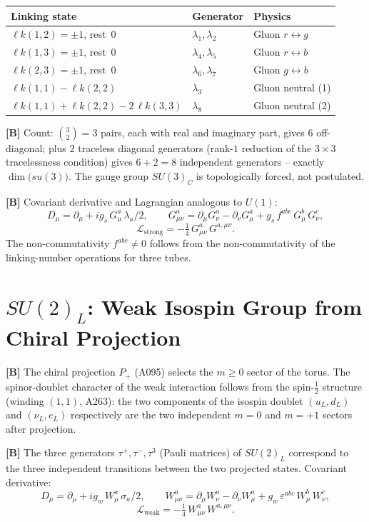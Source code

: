 \begin{center}
\renewcommand{\arraystretch}{1.3}
{\small\begin{tabular}{lll}
\toprule
Linking state & Generator & Physics \\
\midrule
$\ell k(1,2)=\pm1$, rest~0 & $\lambda_1,\lambda_2$ & Gluon $r\leftrightarrow g$ \\
$\ell k(1,3)=\pm1$, rest~0 & $\lambda_4,\lambda_5$ & Gluon $r\leftrightarrow b$ \\
$\ell k(2,3)=\pm1$, rest~0 & $\lambda_6,\lambda_7$ & Gluon $g\leftrightarrow b$ \\
$\ell k(1,1)-\ell k(2,2)$  & $\lambda_3$           & Gluon neutral (1) \\
$\ell k(1,1)+\ell k(2,2)-2\,\ell k(3,3)$ & $\lambda_8$ & Gluon neutral (2) \\
\bottomrule
\end{tabular}}
\renewcommand{\arraystretch}{1.0}
\end{center}

\textbf{[B]} Count: $\binom{3}{2}=3$ pairs, each with real and imaginary part,
gives $6$ off-diagonal; plus $2$ traceless diagonal generators (rank-$1$ reduction
of the $3\times3$ tracelessness condition) gives $6+2=8$ independent generators
-- exactly $\dim\bigl(su(3)\bigr)$. The gauge group $SU(3)_C$ is topologically
forced, not postulated.

\textbf{[B]} Covariant derivative and Lagrangian analogous to $U(1)$:
\[
  D_\mu = \partial_\mu + ig_s\,G_\mu^a\,\lambda_a/2,
  \qquad
  G_{\mu\nu}^a = \partial_\mu G_\nu^a - \partial_\nu G_\mu^a
    + g_s\,f^{abc}\,G_\mu^b\,G_\nu^c,
\]
\[
  \mathcal{L}_\text{strong} = -\tfrac14\,G_{\mu\nu}^a\,G^{a,\mu\nu}.
\]
The non-commutativity $f^{abc}\neq0$ follows from the non-commutativity of the
linking-number operations for three tubes.

\section{$SU(2)_L$: Weak Isospin Group from Chiral Projection}

\textbf{[B]} The chiral projection $P_+$ (A095) selects the $m\ge0$ sector
of the torus. The spinor-doublet character of the weak interaction follows
from the spin-$\tfrac12$ structure (winding $(1,1)$, A263): the two
components of the isospin doublet $(u_L, d_L)$ and $(\nu_L, e_L)$ respectively
are the two independent $m=0$ and $m=+1$ sectors after projection.

\textbf{[B]} The three generators $\tau^+, \tau^-, \tau^3$ (Pauli matrices)
of $SU(2)_L$ correspond to the three independent transitions between the
two projected states. Covariant derivative:
\[
  D_\mu = \partial_\mu + ig_w\,W_\mu^a\,\sigma_a/2,
  \qquad
  W_{\mu\nu}^a = \partial_\mu W_\nu^a - \partial_\nu W_\mu^a
    + g_w\,\varepsilon^{abc}\,W_\mu^b\,W_\nu^c,
\]
\[
  \mathcal{L}_\text{weak} = -\tfrac14\,W_{\mu\nu}^a\,W^{a,\mu\nu}.
\]

